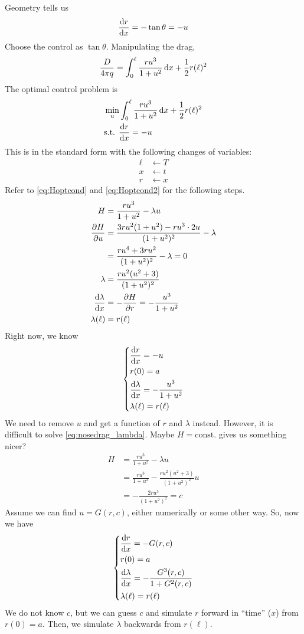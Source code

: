 Geometry tells us
\[ \frac{\mathop{}\!\mathrm{d} r}{\mathop{}\!\mathrm{d} x} = -\tan\theta = -u \]
Choose the control as $\tan\theta$. Manipulating the drag,
\[ \frac{D}{4\pi q} = \int_0^\ell \frac{ru^3}{1+u^2} \mathop{}\!\mathrm{d} x + \frac{1}{2} r(\ell)^2 \]
The optimal control problem is
\begin{align}
  & \min_u \int_0^\ell \frac{ru^3}{1+u^2} \mathop{}\!\mathrm{d} x + \frac{1}{2} r(\ell)^2 \\
  & \text{s.t. } \frac{\mathop{}\!\mathrm{d} r}{\mathop{}\!\mathrm{d} x}=-u
\end{align}
This is in the standard form with the following changes of variables:
\begin{align}
  \ell & \longleftarrow T \\
  x & \longleftarrow t \\
  r & \longleftarrow x
\end{align}
Refer to \eqref{eq:Hoptcond} and \eqref{eq:Hoptcond2} for the following steps.
\begin{align}
  H &= \frac{ru^3}{1+u^2} - \lambda u \\
  \frac{\partial H}{\partial u} &= \frac{3ru^2(1+u^2)-ru^3\cdot 2u}{(1+u^2)^2} - \lambda \\
    &= \frac{ru^4 + 3ru^2}{(1+u^2)^2} - \lambda = 0 \\
  \lambda &= \frac{ru^2 (u^2 + 3)}{(1+u^2)^2} \label{eq:nosedrag_lambda} \\
  \frac{\mathop{}\!\mathrm{d}\lambda}{\mathop{}\!\mathrm{d} x} &= -\frac{\partial H}{\partial r} = -\frac{u^3}{1+u^2} \\
  \lambda(\ell) &= r(\ell)
\end{align}
Right now, we know
\[ \begin{dcases}
    \frac{\mathop{}\!\mathrm{d} r}{\mathop{}\!\mathrm{d} x} = -u \\
    r(0) = a \\
    \frac{\mathop{}\!\mathrm{d}\lambda}{\mathop{}\!\mathrm{d} x} = -\frac{u^3}{1+u^2} \\
    \lambda(\ell) = r(\ell)
  \end{dcases} \]
We need to remove $u$ and get a function of $r$ and $\lambda$ instead. However, it is difficult to solve \eqref{eq:nosedrag_lambda}. Maybe $H=\text{const.}$ gives us something nicer?
\begin{align}
  H &= \frac{ru^3}{1+u^2} - \lambda u \\
    &= \frac{ru^3}{1+u^2} - \frac{ru^2 (u^2 + 3)}{(1+u^2)^2} u \\
    &= - \frac{2ru^3}{(1+u^2)^2} = c
\end{align}
Assume we can find $u=G(r,c)$, either numerically or some other way. So, now we have
\[ \begin{dcases}
    \frac{\mathop{}\!\mathrm{d} r}{\mathop{}\!\mathrm{d} x} = -G(r,c) \\
    r(0) = a \\
    \frac{\mathop{}\!\mathrm{d}\lambda}{\mathop{}\!\mathrm{d} x} = -\frac{G^3(r,c)}{1+G^2(r,c)} \\
    \lambda(\ell) = r(\ell)
  \end{dcases} \]
We do not know $c$, but we can guess $c$ and simulate $r$ forward in ``time'' ($x$) from $r(0)=a$. Then, we simulate $\lambda$ backwards from $r(\ell)$.

